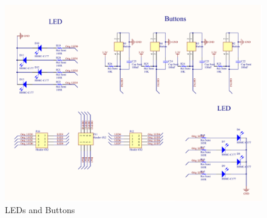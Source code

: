 \begin{figure}[h]
  \centering
  \includegraphics[width=\textwidth]{fig/pcb/schematics/pcbschematic_ledbtn.pdf}
  \caption{LEDs and Buttons}
  \label{fig:schematic-pcb-ledbtn}
\end{figure}
